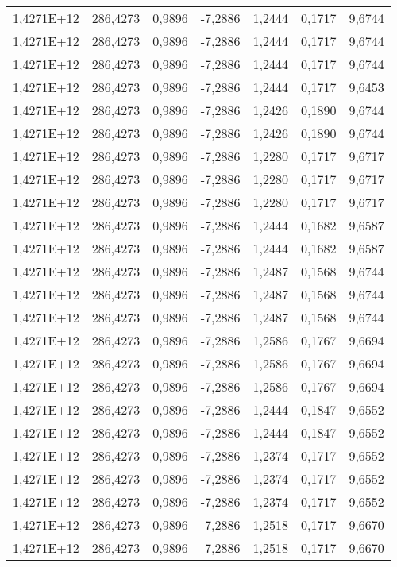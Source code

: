 \begin{table}[htbp]
\begin{tabular}{rrrrrrr}
    1,4271E+12 & 286,4273 & 0,9896 & -7,2886 & 1,2444 & 0,1717 & 9,6744 \\
    1,4271E+12 & 286,4273 & 0,9896 & -7,2886 & 1,2444 & 0,1717 & 9,6744 \\
    1,4271E+12 & 286,4273 & 0,9896 & -7,2886 & 1,2444 & 0,1717 & 9,6744 \\
    1,4271E+12 & 286,4273 & 0,9896 & -7,2886 & 1,2444 & 0,1717 & 9,6453 \\
    1,4271E+12 & 286,4273 & 0,9896 & -7,2886 & 1,2426 & 0,1890 & 9,6744 \\
    1,4271E+12 & 286,4273 & 0,9896 & -7,2886 & 1,2426 & 0,1890 & 9,6744 \\
    1,4271E+12 & 286,4273 & 0,9896 & -7,2886 & 1,2280 & 0,1717 & 9,6717 \\
    1,4271E+12 & 286,4273 & 0,9896 & -7,2886 & 1,2280 & 0,1717 & 9,6717 \\
    1,4271E+12 & 286,4273 & 0,9896 & -7,2886 & 1,2280 & 0,1717 & 9,6717 \\
    1,4271E+12 & 286,4273 & 0,9896 & -7,2886 & 1,2444 & 0,1682 & 9,6587 \\
    1,4271E+12 & 286,4273 & 0,9896 & -7,2886 & 1,2444 & 0,1682 & 9,6587 \\
    1,4271E+12 & 286,4273 & 0,9896 & -7,2886 & 1,2487 & 0,1568 & 9,6744 \\
    1,4271E+12 & 286,4273 & 0,9896 & -7,2886 & 1,2487 & 0,1568 & 9,6744 \\
    1,4271E+12 & 286,4273 & 0,9896 & -7,2886 & 1,2487 & 0,1568 & 9,6744 \\
    1,4271E+12 & 286,4273 & 0,9896 & -7,2886 & 1,2586 & 0,1767 & 9,6694 \\
    1,4271E+12 & 286,4273 & 0,9896 & -7,2886 & 1,2586 & 0,1767 & 9,6694 \\
    1,4271E+12 & 286,4273 & 0,9896 & -7,2886 & 1,2586 & 0,1767 & 9,6694 \\
    1,4271E+12 & 286,4273 & 0,9896 & -7,2886 & 1,2444 & 0,1847 & 9,6552 \\
    1,4271E+12 & 286,4273 & 0,9896 & -7,2886 & 1,2444 & 0,1847 & 9,6552 \\
    1,4271E+12 & 286,4273 & 0,9896 & -7,2886 & 1,2374 & 0,1717 & 9,6552 \\
    1,4271E+12 & 286,4273 & 0,9896 & -7,2886 & 1,2374 & 0,1717 & 9,6552 \\
    1,4271E+12 & 286,4273 & 0,9896 & -7,2886 & 1,2374 & 0,1717 & 9,6552 \\
    1,4271E+12 & 286,4273 & 0,9896 & -7,2886 & 1,2518 & 0,1717 & 9,6670 \\
    1,4271E+12 & 286,4273 & 0,9896 & -7,2886 & 1,2518 & 0,1717 & 9,6670 \\
    \bottomrule
    \end{tabular}%
\end{table}%

